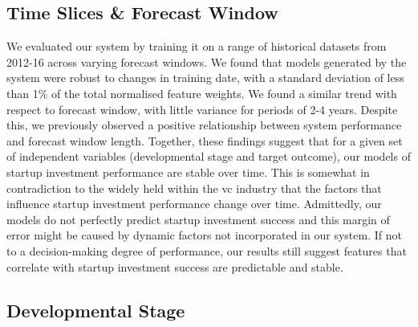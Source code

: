 \documentclass[../thesis/thesis.tex]{subfiles}
\begin{document}
\subsection{Time Slices \& Forecast Window}

We evaluated our system by training it on a range of historical datasets from 2012-16 across varying forecast windows. We found that models generated by the system were robust to changes in training date, with a standard deviation of less than 1\% of the total normalised feature weights. We found a similar trend with respect to forecast window, with little variance for periods of 2-4 years. Despite this, we previously observed a positive relationship between system performance and forecast window length. Together, these findings suggest that for a given set of independent variables (developmental stage and target outcome), our models of startup investment performance are stable over time. This is somewhat in contradiction to the widely held within the \gls{vc} industry that the factors that influence startup investment performance change over time. Admittedly, our models do not perfectly predict startup investment success and this margin of error might be caused by dynamic factors not incorporated in our system. If not to a decision-making degree of performance, our results still suggest features that correlate with startup investment success are predictable and stable.

\subsection{Developmental Stage}
\end{document}
